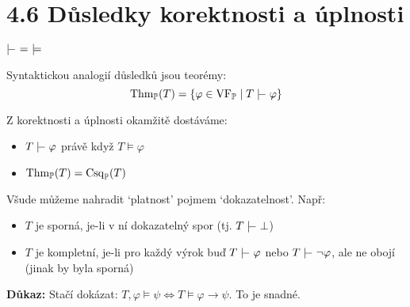 \documentclass{beamer}
\begin{document}
\section{4.6 Důsledky korektnosti a úplnosti}


\begin{frame}{$\proves\ =\ \models$}

    Syntaktickou analogií \alert{důsledků} jsou \alert{teorémy}:
    $$\Thm_\mathbb P(T)=\{\varphi\in\VF_\mathbb P\mid T\proves\varphi\}$$
    
    Z korektnosti a úplnosti okamžitě dostáváme:
        \begin{itemize}
            \item $T\proves\varphi$ právě když $T\models\varphi$
            \item $\operatorname{Thm}_\mathbb P(T)=\operatorname{Csq}_\mathbb P(T)$
        \end{itemize}
    
    Všude můžeme nahradit `\alert{platnost}' pojmem `\alert{dokazatelnost}'.  Např:
    \begin{itemize}
        \item $T$ je \alert{sporná}, je-li v ní dokazatelný spor (tj. \alert{$T\proves\bot$})
        \item $T$ je \alert{kompletní}, je-li pro každý výrok buď $T\proves\varphi$ nebo $T\proves\neg\varphi$, ale ne obojí (jinak by byla sporná)
    \end{itemize}


    \textbf{Důkaz:} Stačí dokázat: $T,\varphi\models\psi\Leftrightarrow T\models\varphi\to\psi$. To je snadné.\hfill\qedsymbol

\end{frame}
\end{document}
